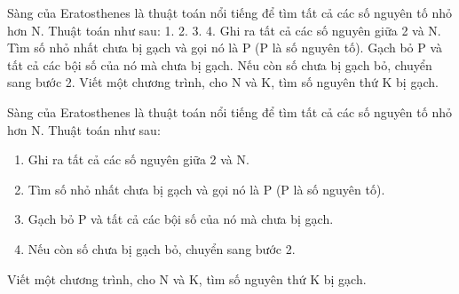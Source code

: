 Sàng của Eratosthenes là thuật toán nổi tiếng để tìm tất cả các số nguyên tố nhỏ hơn N. Thuật toán như sau: 1. 2. 3. 4. Ghi ra tất cả các số nguyên giữa 2 và N. Tìm số nhỏ nhất chưa bị gạch và gọi nó là P (P là số nguyên tố). Gạch bỏ P và tất cả các bội số của nó mà chưa bị gạch. Nếu còn số chưa bị gạch bỏ, chuyển sang bước 2. Viết một chương trình, cho N và K, tìm số nguyên thứ K bị gạch.

Sàng của Eratosthenes là thuật toán nổi tiếng để tìm tất cả các số nguyên tố nhỏ hơn N. Thuật toán như sau:
\begin{enumerate}
	\item Ghi ra tất cả các số nguyên giữa 2 và N.
	\item Tìm số nhỏ nhất chưa bị gạch và gọi nó là P (P là số nguyên tố).
	\item Gạch bỏ P và tất cả các bội số của nó mà chưa bị gạch.
	\item Nếu còn số chưa bị gạch bỏ, chuyển sang bước 2.
\end{enumerate}

Viết một chương trình, cho N và K, tìm số nguyên thứ K bị gạch.

\